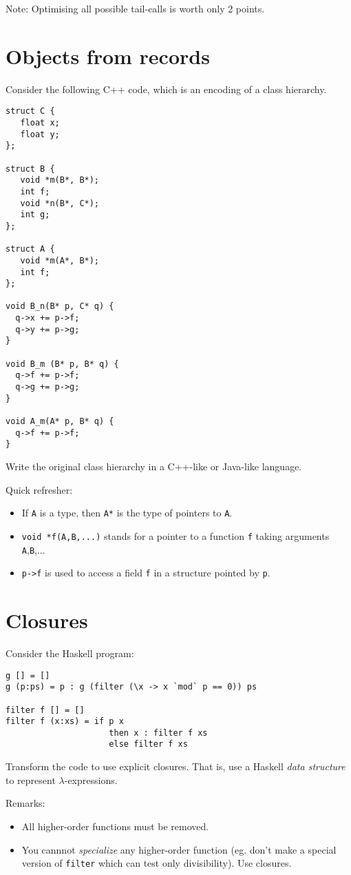 \documentclass{article}
\begin{document}
Note: Optimising all possible tail-calls is worth only 2 points.

\newpage
\section{Objects from records}

Consider the following C++ code, which is an encoding of a class
hierarchy.
\begin{verbatim}
struct C {
   float x;
   float y;
};

struct B {
   void *m(B*, B*);
   int f;
   void *n(B*, C*);
   int g;
};

struct A {
   void *m(A*, B*);
   int f;
};

void B_n(B* p, C* q) {
  q->x += p->f;
  q->y += p->g;
}

void B_m (B* p, B* q) {
  q->f += p->f;
  q->g += p->g;
}

void A_m(A* p, B* q) {
  q->f += p->f;
}
\end{verbatim}

Write the original class hierarchy in a C++-like or Java-like language.

Quick refresher:
\begin{itemize}
\item If \texttt{A} is a type, then \texttt{A*} is the type of
  pointers to \texttt{A}.
\item \texttt{void *f(A,B,...)} stands for a pointer to a function
  \texttt{f} taking arguments \texttt{A},\texttt{B},...
\item \texttt{p->f} is used to access a field \texttt{f} in a
  structure pointed by \texttt{p}.
\end{itemize}
\newpage
\section{Closures}
Consider the Haskell program:

\begin{verbatim}
g [] = []
g (p:ps) = p : g (filter (\x -> x `mod` p == 0)) ps

filter f [] = []
filter f (x:xs) = if p x 
                     then x : filter f xs  
                     else filter f xs
\end{verbatim}

Transform the code to use explicit closures. That is, use a Haskell
\emph{data structure} to represent $\lambda$-expressions.

Remarks:
\begin{itemize}
\item All higher-order functions must be removed.
\item You cannnot \emph{specialize} any higher-order function
  (eg. don't make a special version of \texttt{filter} which can test
  only divisibility).  Use closures.
\end{itemize}
\end{document}
